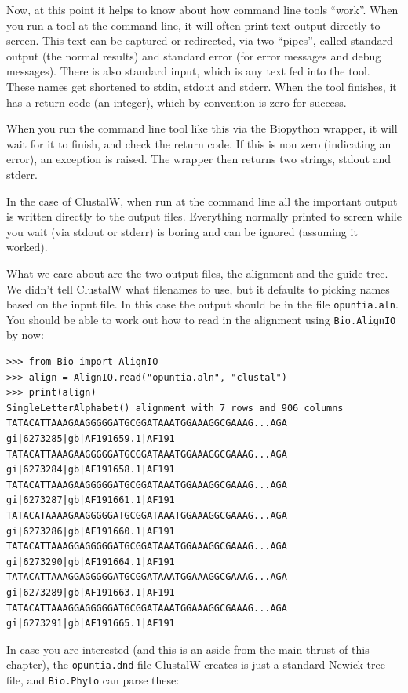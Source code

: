 \documentclass{report}
\begin{document}
Now, at this point it helps to know about how command line tools ``work''.
When you run a tool at the command line, it will often print text output
directly to screen. This text can be captured or redirected, via
two ``pipes'', called standard output (the normal results) and standard
error (for error messages and debug messages). There is also standard
input, which is any text fed into the tool. These names get shortened
to stdin, stdout and stderr. When the tool finishes, it has a return
code (an integer), which by convention is zero for success.

When you run the command line tool like this via the Biopython wrapper,
it will wait for it to finish, and check the return code. If this is
non zero (indicating an error), an exception is raised. The wrapper
then returns two strings, stdout and stderr.

In the case of ClustalW, when run at the command line all the important
output is written directly to the output files. Everything normally printed to
screen while you wait (via stdout or stderr) is boring and can be
ignored (assuming it worked).

What we care about are the two output files, the alignment and the guide
tree. We didn't tell ClustalW what filenames to use, but it defaults to
picking names based on the input file. In this case the output should be
in the file \verb|opuntia.aln|.
You should be able to work out how to read in the alignment using
\verb|Bio.AlignIO| by now:

\begin{verbatim}
>>> from Bio import AlignIO
>>> align = AlignIO.read("opuntia.aln", "clustal")
>>> print(align)
SingleLetterAlphabet() alignment with 7 rows and 906 columns
TATACATTAAAGAAGGGGGATGCGGATAAATGGAAAGGCGAAAG...AGA gi|6273285|gb|AF191659.1|AF191
TATACATTAAAGAAGGGGGATGCGGATAAATGGAAAGGCGAAAG...AGA gi|6273284|gb|AF191658.1|AF191
TATACATTAAAGAAGGGGGATGCGGATAAATGGAAAGGCGAAAG...AGA gi|6273287|gb|AF191661.1|AF191
TATACATAAAAGAAGGGGGATGCGGATAAATGGAAAGGCGAAAG...AGA gi|6273286|gb|AF191660.1|AF191
TATACATTAAAGGAGGGGGATGCGGATAAATGGAAAGGCGAAAG...AGA gi|6273290|gb|AF191664.1|AF191
TATACATTAAAGGAGGGGGATGCGGATAAATGGAAAGGCGAAAG...AGA gi|6273289|gb|AF191663.1|AF191
TATACATTAAAGGAGGGGGATGCGGATAAATGGAAAGGCGAAAG...AGA gi|6273291|gb|AF191665.1|AF191
\end{verbatim}

In case you are interested (and this is an aside from the main thrust of this
chapter), the \texttt{opuntia.dnd} file ClustalW creates is just a standard
Newick tree file, and \verb|Bio.Phylo| can parse these:
\end{document}
